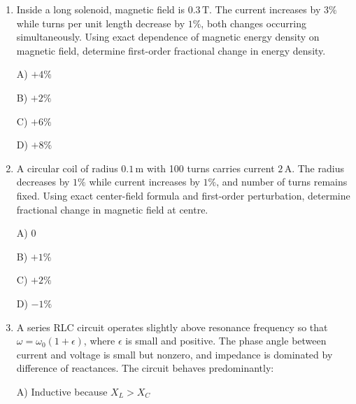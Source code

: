 \documentclass[12pt]{article}
\begin{document}
\begin{enumerate}[leftmargin=*]
A) \(\displaystyle \frac{1}{f_1f_2}\)  

B) \(\displaystyle \frac{d}{f_1f_2}\)  

C) \(\displaystyle \frac{1}{f_{\text{eq}}^2}\)  

D) \(\displaystyle \frac{d}{f_{\text{eq}}^2}\) 


\item Inside a long solenoid, magnetic field is \(0.3\,\text{T}\). The current increases by \(3\%\) while turns per unit length decrease by \(1\%\), both changes occurring simultaneously. Using exact dependence of magnetic energy density on magnetic field, determine first-order fractional change in energy density.  

A) \(+4\%\)  

B) \(+2\%\)  

C) \(+6\%\)  

D) \(+8\%\)  

\item A circular coil of radius \(0.1\,\text{m}\) with 100 turns carries current \(2\,\text{A}\). The radius decreases by \(1\%\) while current increases by \(1\%\), and number of turns remains fixed. Using exact center-field formula and first-order perturbation, determine fractional change in magnetic field at centre.  


A) \(0\)  

B) \(+1\%\)  

C) \(+2\%\)  

D) \(-1\%\)  

\item A series RLC circuit operates slightly above resonance frequency so that \(\omega = \omega_0(1+\epsilon)\), where \(\epsilon\) is small and positive. The phase angle between current and voltage is small but nonzero, and impedance is dominated by difference of reactances. The circuit behaves predominantly:  

A) Inductive because \(X_L>X_C\)  


\end{enumerate}
\end{document}
